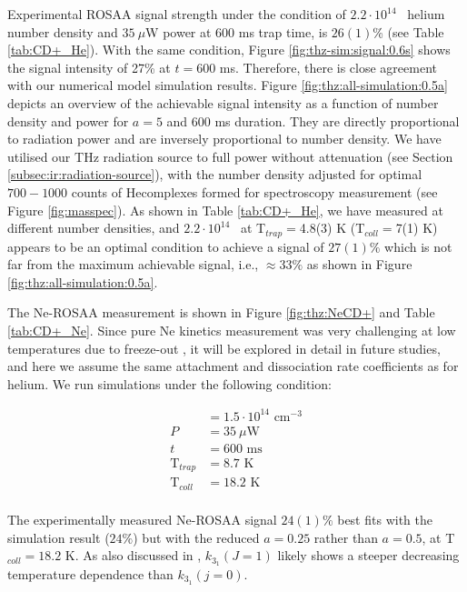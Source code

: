 
Experimental ROSAA signal strength under the condition of $2.2 \cdot 10^{14}$
\percc\ helium number density and $35\ \mu$W power at 600 ms trap time, is
$26(1)$\% (see Table \ref{tab:CD+_He}). With the same condition, Figure
\ref{fig:thz-sim:signal:0.6s} shows the signal intensity of 27\% at $t=600$ ms.
Therefore, there is close agreement with our numerical model simulation
results. Figure \ref{fig:thz:all-simulation:0.5a} depicts an overview of the
achievable signal intensity as a function of number density and power for $a=5$
and 600 ms duration. They are directly proportional to radiation power and are
inversely proportional to number density. We have utilised our THz radiation
source to full power without attenuation (see Section
\ref{subsec:ir:radiation-source}), with the number density adjusted for optimal
$700-1000$ counts of He\CD complexes formed for spectroscopy measurement (see
Figure \ref{fig:masspec}). As shown in Table \ref{tab:CD+_He}, we have measured
at different number densities, and $2.2 \cdot 10^{14}$ \percc\ at
T$_{trap}=$4.8(3) K (T$_{coll}=$7(1) K) appears to be an optimal condition to
achieve a signal of $27(1) \%$ which is not far from the maximum achievable
signal, i.e., $\approx 33 \%$ as shown in Figure
\ref{fig:thz:all-simulation:0.5a}.

The Ne-ROSAA measurement is shown in Figure \ref{fig:thz:NeCD+} and Table
\ref{tab:CD+_Ne}. Since pure Ne kinetics measurement was very challenging at
low temperatures due to freeze-out , it will be explored in detail in future
studies, and here we assume the same attachment and dissociation rate
coefficients as for helium. We run simulations under the following condition:

\begin{align*}
    [Ne]            & = 1.5 \cdot 10^{14} \text{ cm}^{-3} \\
    P               & = 35\ \mu \text{W}                  \\
    t               & = 600 \text{ ms}                    \\
    \text{T}_{trap} & = 8.7 \text{ K}                     \\
    \text{T}_{coll} & = 18.2 \text{ K}                    \\
\end{align*}

The experimentally measured Ne-ROSAA signal $24(1) \%$ best fits with the
simulation result ($24 \%$) but with the reduced $a=0.25$ rather than $a=0.5$,
at T$_{coll}=18.2$ K. As also discussed in \citet{Brunken2017}, $k_{3_1}(J=1)$
likely shows a steeper decreasing temperature dependence than $k_{3_1}(j=0)$.\\

